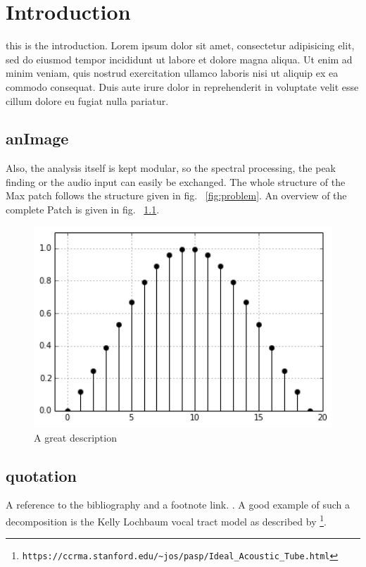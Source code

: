 \chapter{Introduction}
\label{sec:introduction}

this is the introduction. Lorem ipsum dolor sit amet, consectetur adipisicing elit, sed do eiusmod
tempor incididunt ut labore et dolore magna aliqua. Ut enim ad minim veniam,
quis nostrud exercitation ullamco laboris nisi ut aliquip ex ea commodo
consequat. Duis aute irure dolor in reprehenderit in voluptate velit esse
cillum dolore eu fugiat nulla pariatur. 

\section{anImage}
\label{anImage}
Also, the analysis itself is kept modular, so the spectral processing, the peak finding or the audio input can easily be exchanged.
The whole structure of the Max patch follows the structure given in fig. ~\ref{fig:problem}. An overview of the complete Patch is given in fig. ~\ref{fig:maxOverview}.

\begin{figure}[H]
	\begin{center}
		\includegraphics[width = 14cm]{img/BAK4_final_12_0.png}
		\caption{A great description}
		\label{fig:maxOverview}
	\end{center}
\end{figure}


\section{quotation}
\label{quotation}
A reference to the bibliography and a footnote link. \citep[see][p. 230]{cook_real_2002}. A good example of such a decomposition is the Kelly Lochbaum vocal tract model as described by \citep{smith_physical_2010}\footnote{\texttt{https://ccrma.stanford.edu/\~{}jos/pasp/Ideal\_Acoustic\_Tube.html}}.


